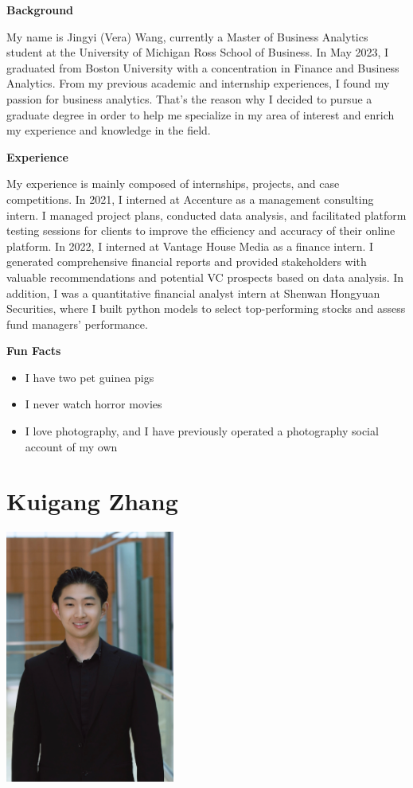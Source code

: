 \documentclass[
]{book}
\begin{document}
\textbf{Background}

My name is Jingyi (Vera) Wang, currently a Master of Business Analytics student at the University of Michigan Ross School of Business. In May 2023, I graduated from Boston University with a concentration in Finance and Business Analytics. From my previous academic and internship experiences, I found my passion for business analytics. That's the reason why I decided to pursue a graduate degree in order to help me specialize in my area of interest and enrich my experience and knowledge in the field.

\textbf{Experience}

My experience is mainly composed of internships, projects, and case competitions. In 2021, I interned at Accenture as a management consulting intern. I managed project plans, conducted data analysis, and facilitated platform testing sessions for clients to improve the efficiency and accuracy of their online platform. In 2022, I interned at Vantage House Media as a finance intern. I generated comprehensive financial reports and provided stakeholders with valuable recommendations and potential VC prospects based on data analysis. In addition, I was a quantitative financial analyst intern at Shenwan Hongyuan Securities, where I built python models to select top-performing stocks and assess fund managers' performance.~

\textbf{Fun Facts}

\begin{itemize}
\item
  I have two pet guinea pigs
\item
  I never watch horror movies
\item
  I love photography, and I have previously operated a photography social account of my own
\end{itemize}

\hypertarget{kuigang-zhang}{%
\section{Kuigang Zhang}\label{kuigang-zhang}}

\includegraphics[width=2.1875in,height=\textheight]{KG Photo.png}
\end{document}
